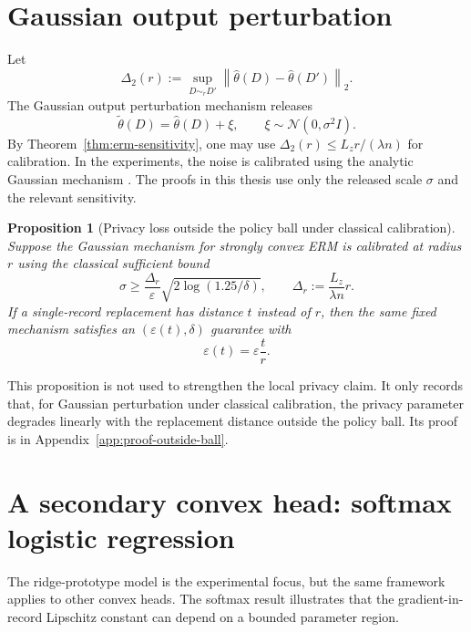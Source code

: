 \documentclass[11pt,a4paper]{report}
\theoremstyle{plain}
\newtheorem{proposition}[theorem]{Proposition}
\theoremstyle{definition}
\theoremstyle{remark}
\newcommand{\N}{\mathcal{N}}
\newcommand{\norm}[1]{\left\lVert #1\right\rVert}
\begin{document}
\section{Gaussian output perturbation}
\label{sec:convex-gaussian-output}

Let
\[
\Delta_2(r):=\sup_{D\sim_r D'}\norm{\hat\theta(D)-\hat\theta(D')}_2.
\]
The Gaussian output perturbation mechanism releases
\[
\widetilde\theta(D)=\hat\theta(D)+\xi,
\qquad
\xi\sim\N(0,\sigma^2I).
\]
By Theorem~\ref{thm:erm-sensitivity}, one may use $\Delta_2(r)\le L_zr/(\lambda n)$ for calibration.  In the experiments, the noise is calibrated using the analytic Gaussian mechanism \cite{balle2018analytic}.  The proofs in this thesis use only the released scale $\sigma$ and the relevant sensitivity.

\begin{proposition}[Privacy loss outside the policy ball under classical calibration]
\label{prop:outside-ball}
Suppose the Gaussian mechanism for strongly convex ERM is calibrated at radius $r$ using the classical sufficient bound
\[
\sigma\ge \frac{\Delta_r}{\varepsilon}\sqrt{2\log(1.25/\delta)},
\qquad
\Delta_r:=\frac{L_z}{\lambda n}r.
\]
If a single-record replacement has distance $t$ instead of $r$, then the same fixed mechanism satisfies an $(\varepsilon(t),\delta)$ guarantee with
\[
\varepsilon(t)=\varepsilon\frac{t}{r}.
\]
\end{proposition}

This proposition is not used to strengthen the local privacy claim.  It only records that, for Gaussian perturbation under classical calibration, the privacy parameter degrades linearly with the replacement distance outside the policy ball.  Its proof is in Appendix~\ref{app:proof-outside-ball}.

\section{A secondary convex head: softmax logistic regression}
\label{sec:softmax-head}

The ridge-prototype model is the experimental focus, but the same framework applies to other convex heads.  The softmax result illustrates that the gradient-in-record Lipschitz constant can depend on a bounded parameter region.
\end{document}
